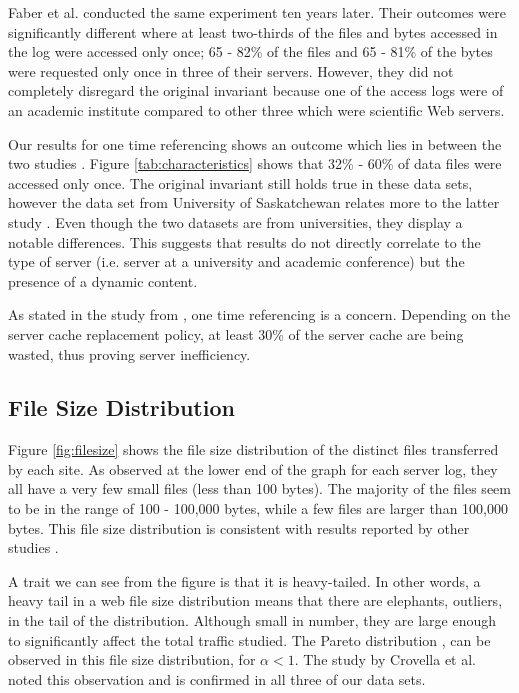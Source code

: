 \documentclass[10pt,conference]{IEEEtran}
\begin{document}
Faber et al. \cite{Faber} conducted the same experiment ten years later. Their outcomes were significantly different where at least two-thirds of the files and bytes accessed in the log were accessed only once; 65 - 82\% of the files and 65 - 81\% of the bytes were requested only once in three of their servers. However, they did not completely disregard the original invariant because one of the access logs were of an academic institute compared to other three which were scientific Web servers.

Our results for one time referencing shows an outcome which lies in between the two studies \cite{invariants, Faber}. Figure \ref{tab:characteristics} shows that 32\% - 60\% of data files were accessed only once. The original invariant still holds true in these data sets, however the data set from University of Saskatchewan relates more to the latter study \cite{Faber}. Even though the two datasets are from universities, they display a notable differences. This suggests that results do not directly correlate to the type of server (i.e. server at a university and academic conference) but the presence of a dynamic content.

As stated in the study from \cite{invariants}, one time referencing is a concern. Depending on the server cache replacement policy, at least 30\% of the server cache are being wasted, thus proving server inefficiency.

\subsection{File Size Distribution} %
\label{sub:file_size_distribution}
Figure \ref{fig:filesize} shows the file size distribution of the distinct files transferred by each site. As observed at the lower end of the graph for each server log, they all have a very few small files (less than 100 bytes). The majority of the files seem to be in the range of 100 - 100,000 bytes, while a few files are larger than 100,000 bytes. This file size distribution is consistent with results reported by other studies \cite{keynote, Braun}.

A trait we can see from the figure is that it is heavy-tailed. In other words, a heavy tail in a web file size distribution means that there are elephants, outliers, in the tail of the distribution. Although small in number, they are large enough to significantly affect the total traffic studied. The Pareto distribution \cite{Kotz}, can be observed in this file size distribution, for \begin{math} \alpha < 1\end{math}. The study by Crovella et al. \cite{Crovella} noted this observation and is confirmed in all three of our data sets.
\end{document}
